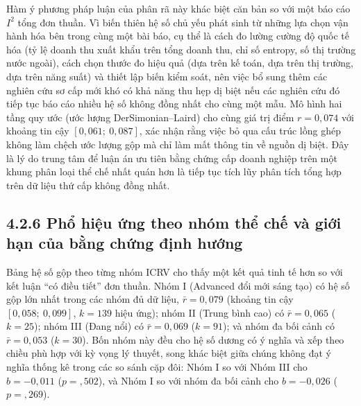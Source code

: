 \documentclass[
  a4paper,
  13pt]{extreport}
\begin{document}
Hàm ý phương pháp luận của phân rã này khác biệt căn bản so với một báo
cáo \(I^2\) tổng đơn thuần. Vì biến thiên hệ số chủ yếu phát sinh từ
những lựa chọn vận hành hóa bên trong cùng một bài báo, cụ thể là cách
đo lường cường độ quốc tế hóa (tỷ lệ doanh thu xuất khẩu trên tổng doanh
thu, chỉ số entropy, số thị trường nước ngoài), cách chọn thước đo hiệu
quả (dựa trên kế toán, dựa trên thị trường, dựa trên năng suất) và thiết
lập biến kiểm soát, nên việc bổ sung thêm các nghiên cứu sơ cấp mới khó
có khả năng thu hẹp dị biệt nếu các nghiên cứu đó tiếp tục báo cáo nhiều
hệ số không đồng nhất cho cùng một mẫu. Mô hình hai tầng quy ước (ước
lượng DerSimonian--Laird) cho cùng giá trị điểm \(r = 0{,}074\) với
khoảng tin cậy \([0{,}061;\ 0{,}087]\), xác nhận rằng việc bỏ qua cấu
trúc lồng ghép không làm chệch ước lượng gộp mà chỉ làm mất thông tin về
nguồn dị biệt. Đây là lý do trung tâm để luận án ưu tiên bằng chứng cấp
doanh nghiệp trên một khung phân loại thể chế nhất quán hơn là tiếp tục
tích lũy phân tích tổng hợp trên dữ liệu thứ cấp không đồng nhất.

\hypertarget{phux1ed5-hiux1ec7u-ux1ee9ng-theo-nhuxf3m-thux1ec3-chux1ebf-vuxe0-giux1edbi-hux1ea1n-cux1ee7a-bux1eb1ng-chux1ee9ng-ux111ux1ecbnh-hux1b0ux1edbng}{%
\subsection{4.2.6 Phổ hiệu ứng theo nhóm thể chế và giới hạn của bằng
chứng định
hướng}\label{phux1ed5-hiux1ec7u-ux1ee9ng-theo-nhuxf3m-thux1ec3-chux1ebf-vuxe0-giux1edbi-hux1ea1n-cux1ee7a-bux1eb1ng-chux1ee9ng-ux111ux1ecbnh-hux1b0ux1edbng}}

Bảng hệ số gộp theo từng nhóm ICRV cho thấy một kết quả tinh tế hơn so
với kết luận ``có điều tiết'' đơn thuần. Nhóm I (Advanced đổi mới sáng
tạo) có hệ số gộp lớn nhất trong các nhóm đủ dữ liệu,
\(\bar{r} = 0{,}079\) (khoảng tin cậy \([0{,}058;\ 0{,}099]\),
\(k = 139\) hiệu ứng); nhóm II (Trung bình cao) có \(\bar{r} = 0{,}065\)
(\(k = 25\)); nhóm III (Đang nổi) có \(\bar{r} = 0{,}069\) (\(k = 91\));
và nhóm đa bối cảnh có \(\bar{r} = 0{,}053\) (\(k = 30\)). Bốn nhóm này
đều cho hệ số dương có ý nghĩa và xếp theo chiều phù hợp với kỳ vọng lý
thuyết, song khác biệt giữa chúng không đạt ý nghĩa thống kê trong các
so sánh cặp đôi: Nhóm I so với Nhóm III cho \(b = -0{,}011\)
(\(p = {,}502\)), và Nhóm I so với nhóm đa bối cảnh cho \(b = -0{,}026\)
(\(p = {,}269\)).
\end{document}
